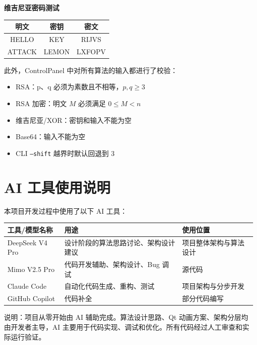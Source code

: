 \documentclass[a4paper,UTF8]{ctexart}
\begin{document}
\textbf{维吉尼亚密码测试}

\begin{center}
\begin{tabular}{ccc}
\toprule
\textbf{明文} & \textbf{密钥} & \textbf{密文} \\
\midrule
HELLO  & KEY   & RIJVS \\
ATTACK & LEMON & LXFOPV \\
\bottomrule
\end{tabular}
\end{center}

此外，ControlPanel 中对所有算法的输入都进行了校验：

\begin{itemize}
  \item RSA：p、q 必须为素数且不相等，$p, q \ge 3$
  \item RSA 加密：明文 $M$ 必须满足 $0 \le M < n$
  \item 维吉尼亚/XOR：密钥和输入不能为空
  \item Base64：输入不能为空
  \item CLI \texttt{--shift} 越界时默认回退到 3
\end{itemize}

\section{AI 工具使用说明}

本项目开发过程中使用了以下 AI 工具：

\begin{center}
\begin{tabularx}{0.9\textwidth}{lXX}
\toprule
\textbf{工具/模型名称} & \textbf{用途} & \textbf{使用位置} \\
\midrule
DeepSeek V4 Pro & 设计阶段的算法思路讨论、架构设计建议 & 项目整体架构与算法设计 \\
Mimo V2.5 Pro & 代码开发辅助、架构设计、Bug 调试 & 源代码          \\
Claude Code    & 自动化代码生成、重构、测试         & 项目架构与分步开发 \\
GitHub Copilot       & 代码补全                           & 部分代码编写        \\
\bottomrule
\end{tabularx}
\end{center}

说明：项目从零开始由 AI 辅助完成。算法设计思路、Qt 动画方案、架构分层均由开发者主导，AI 主要用于代码实现、调试和优化。所有代码经过人工审查和实际运行验证。
\end{document}
